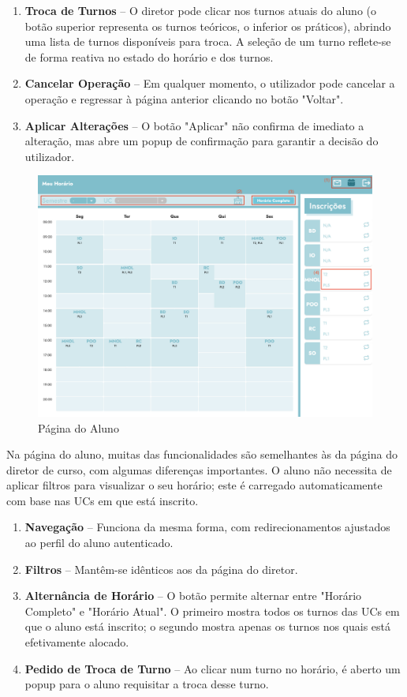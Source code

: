 \documentclass{article}
\begin{document}
\begin{enumerate}
    \item \textbf{Troca de Turnos} – O diretor pode clicar nos turnos atuais do aluno (o botão superior representa os turnos teóricos, o inferior os práticos), abrindo uma lista de turnos disponíveis para troca. A seleção de um turno reflete-se de forma reativa no estado do horário e dos turnos.
    \item \textbf{Cancelar Operação} – Em qualquer momento, o utilizador pode cancelar a operação e regressar à página anterior clicando no botão "Voltar".
    \item \textbf{Aplicar Alterações} – O botão "Aplicar" não confirma de imediato a alteração, mas abre um popup de confirmação para garantir a decisão do utilizador.
\end{enumerate}
\begin{figure}[H]
    \centering
    \includegraphics[width=0.75\linewidth]{manual/student-page.png}
    \caption{Página do Aluno}
    \label{fig:enter-label}
\end{figure}
Na página do aluno, muitas das funcionalidades são semelhantes às da página do diretor de curso, com algumas diferenças importantes. O aluno não necessita de aplicar filtros para visualizar o seu horário; este é carregado automaticamente com base nas UCs em que está inscrito.
\begin{enumerate}
    \item \textbf{Navegação} – Funciona da mesma forma, com redirecionamentos ajustados ao perfil do aluno autenticado.
    \item \textbf{Filtros} – Mantêm-se idênticos aos da página do diretor.
    \item \textbf{Alternância de Horário} – O botão permite alternar entre "Horário Completo" e "Horário Atual". O primeiro mostra todos os turnos das UCs em que o aluno está inscrito; o segundo mostra apenas os turnos nos quais está efetivamente alocado.
    \item \textbf{Pedido de Troca de Turno} – Ao clicar num turno no horário, é aberto um popup para o aluno requisitar a troca desse turno.
\end{enumerate}
\end{document}
